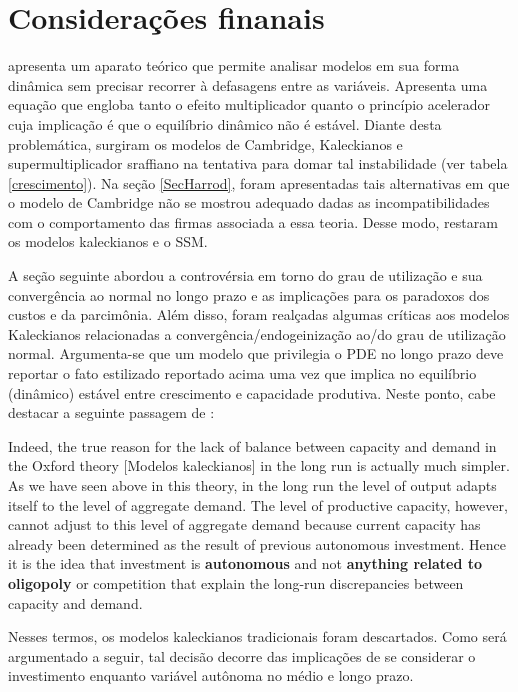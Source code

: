 \section{Considerações finanais}
\label{Concl1}


\textcite{harrod_essay_1939} apresenta um aparato teórico que permite analisar modelos em sua forma dinâmica sem precisar recorrer à defasagens entre as variáveis. Apresenta uma equação que engloba tanto o efeito multiplicador quanto o princípio acelerador cuja implicação é que o equilíbrio dinâmico não é estável. Diante desta problemática, surgiram os modelos de Cambridge, Kaleckianos e supermultiplicador sraffiano na tentativa para domar tal instabilidade (ver tabela \ref{crescimento}). Na seção \ref{SecHarrod}, foram apresentadas tais alternativas em que o modelo de Cambridge não se mostrou adequado dadas as incompatibilidades com o comportamento das firmas associada a essa teoria. Desse modo, restaram os modelos kaleckianos e o SSM. 

A seção seguinte abordou a controvérsia em torno do grau de utilização e sua convergência ao normal no longo prazo e as implicações para os paradoxos dos custos e da parcimônia. Além disso, foram realçadas algumas críticas aos modelos Kaleckianos relacionadas a convergência/endogeinização ao/do grau de utilização normal. Argumenta-se que um modelo que privilegia o PDE no longo prazo deve reportar o fato estilizado reportado acima uma vez que implica no equilíbrio (dinâmico) estável entre crescimento e capacidade produtiva. Neste ponto, cabe destacar a seguinte passagem de \textcite[p.~120, grifos nossos]{serrano_sraffian_1995}:

\begin{citacao}
Indeed, the true reason for the lack of balance between capacity and demand in the Oxford theory [Modelos kaleckianos] in the long run is actually much simpler. As we have seen above in this theory, in the long run the level of output adapts itself to the level of aggregate demand. The level of productive capacity, however, cannot adjust to this level of aggregate demand because current capacity has already been determined as the result of previous autonomous investment. Hence it is the idea that investment is \textbf{autonomous} and not \textbf{anything related to oligopoly} or competition that explain the long-run discrepancies between capacity and demand.
\end{citacao}
Nesses termos, os modelos kaleckianos tradicionais foram descartados. Como será argumentado a seguir, tal decisão decorre das implicações de se considerar o investimento enquanto variável autônoma no médio  e longo prazo.

